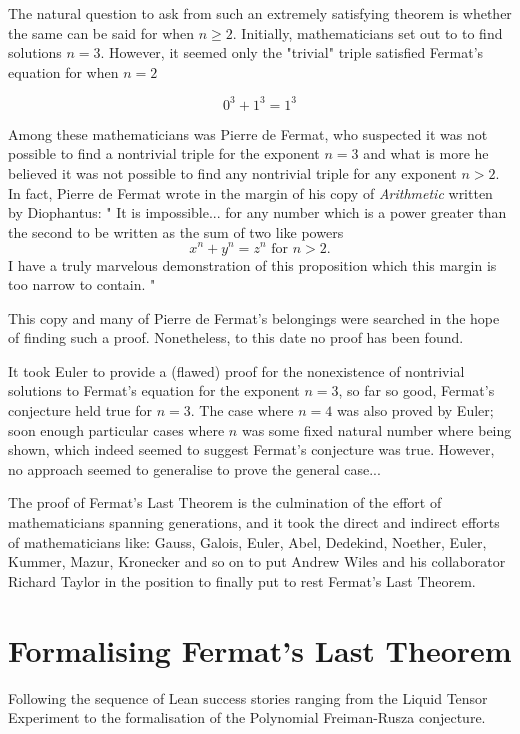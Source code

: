 The natural question to ask from such an extremely satisfying theorem is whether the same can be said for when $n \ge 2$. Initially, mathematicians set out to
to find solutions $n = 3$. However, it seemed only the "trivial" triple satisfied Fermat's equation for when $n = 2$

\[
0^3 + 1^3 = 1^3
\]

Among these mathematicians was Pierre de Fermat, who suspected it was not possible to find a nontrivial triple for the exponent $n= 3$ and what is more he believed
it was not possible to find any nontrivial triple for any exponent $n > 2$. In fact, Pierre de Fermat wrote in the margin of his copy of \textit{Arithmetic} written by Diophantus:
"
It is impossible... for any number which is a power greater than the second to be written as the sum of two like powers 
\[ 
x^n + y^n = z^n \text{ for } n > 2.
\]
I have a truly marvelous demonstration of this proposition which this margin is too narrow to contain.
"

This copy and many of Pierre de Fermat's belongings were searched in the hope of finding such a proof. Nonetheless, to this date no proof has been found.


It took Euler to provide a (flawed) proof for the nonexistence of nontrivial solutions to Fermat's equation for the exponent $n = 3$, so far so good, Fermat's conjecture held true for $n = 3$.
The case where $n = 4$ was also proved by Euler; soon enough particular cases where $n$ was some fixed natural number where being shown, which indeed seemed to suggest Fermat's conjecture was true.
However, no approach seemed to generalise to prove the general case...

The proof of Fermat's Last Theorem is the culmination of the effort of mathematicians spanning generations, and it took the direct and indirect efforts of mathematicians like: 
Gauss, Galois, Euler, Abel, Dedekind, Noether, Euler, Kummer, Mazur, Kronecker and so on to put Andrew Wiles and his collaborator Richard Taylor in the position 
to finally put to rest Fermat's Last Theorem.


\section{Formalising Fermat's Last Theorem}

Following the sequence of Lean success stories ranging from the Liquid Tensor Experiment to the formalisation of the Polynomial Freiman-Rusza conjecture. 

